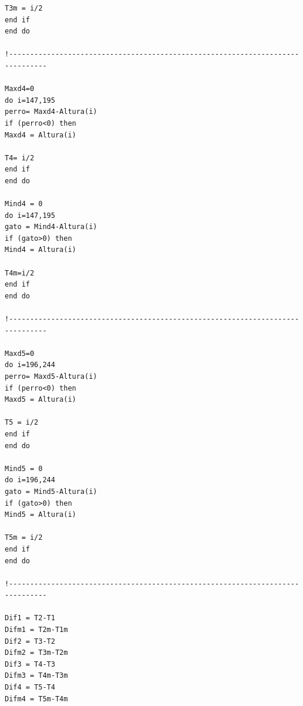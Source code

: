 \documentclass[12pt]{article}
\begin{document}
\begin{verbatim}
T3m = i/2
end if
end do

!-------------------------------------------------------------------------------

Maxd4=0
do i=147,195
perro= Maxd4-Altura(i)
if (perro<0) then 
Maxd4 = Altura(i)

T4= i/2
end if
end do

Mind4 = 0
do i=147,195
gato = Mind4-Altura(i)
if (gato>0) then
Mind4 = Altura(i)

T4m=i/2
end if
end do

!-------------------------------------------------------------------------------

Maxd5=0
do i=196,244
perro= Maxd5-Altura(i)
if (perro<0) then 
Maxd5 = Altura(i)

T5 = i/2
end if
end do

Mind5 = 0
do i=196,244
gato = Mind5-Altura(i)
if (gato>0) then
Mind5 = Altura(i)

T5m = i/2
end if
end do

!-------------------------------------------------------------------------------

Dif1 = T2-T1
Difm1 = T2m-T1m
Dif2 = T3-T2
Difm2 = T3m-T2m
Dif3 = T4-T3
Difm3 = T4m-T3m
Dif4 = T5-T4
Difm4 = T5m-T4m


\end{verbatim}
\end{document}
